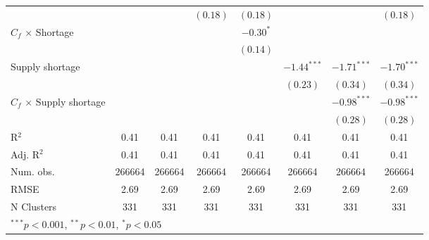 \begin{tabular}{l c c c c c c c }
                                 &               &               & $(0.18)$      & $(0.18)$      &               &               & $(0.18)$      \\
$C_{f}$ $\times$ Shortage        &               &               &               & $-0.30^{*}$   &               &               &               \\
                                 &               &               &               & $(0.14)$      &               &               &               \\
Supply shortage                  &               &               &               &               & $-1.44^{***}$ & $-1.71^{***}$ & $-1.70^{***}$ \\
                                 &               &               &               &               & $(0.23)$      & $(0.34)$      & $(0.34)$      \\
$C_{f}$ $\times$ Supply shortage &               &               &               &               &               & $-0.98^{***}$ & $-0.98^{***}$ \\
                                 &               &               &               &               &               & $(0.28)$      & $(0.28)$      \\
\midrule
R$^2$                            & 0.41          & 0.41          & 0.41          & 0.41          & 0.41          & 0.41          & 0.41          \\
Adj. R$^2$                       & 0.41          & 0.41          & 0.41          & 0.41          & 0.41          & 0.41          & 0.41          \\
Num. obs.                        & 266664        & 266664        & 266664        & 266664        & 266664        & 266664        & 266664        \\
RMSE                             & 2.69          & 2.69          & 2.69          & 2.69          & 2.69          & 2.69          & 2.69          \\
N Clusters                       & 331           & 331           & 331           & 331           & 331           & 331           & 331           \\
\bottomrule
\multicolumn{8}{l}{\tiny{$^{***}p<0.001$, $^{**}p<0.01$, $^*p<0.05$}}
\end{tabular}

